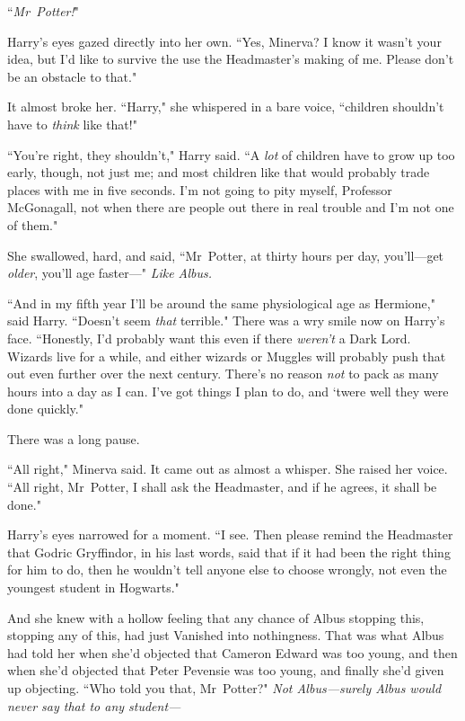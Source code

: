 ``\emph{Mr~Potter!}"

Harry's eyes gazed directly into her own. ``Yes, Minerva? I know it wasn't your idea, but I'd like to survive the use the Headmaster's making of me. Please don't be an obstacle to that."

It almost broke her. ``Harry," she whispered in a bare voice, ``children shouldn't have to \emph{think} like that!"

``You're right, they shouldn't," Harry said. ``A \emph{lot} of children have to grow up too early, though, not just me; and most children like that would probably trade places with me in five seconds. I'm not going to pity myself, Professor McGonagall, not when there are people out there in real trouble and I'm not one of them."

She swallowed, hard, and said, ``Mr~Potter, at thirty hours per day, you'll—get \emph{older}, you'll age faster—" \emph{Like Albus.}

``And in my fifth year I'll be around the same physiological age as Hermione," said Harry. ``Doesn't seem \emph{that} terrible." There was a wry smile now on Harry's face. ``Honestly, I'd probably want this even if there \emph{weren't} a Dark Lord. Wizards live for a while, and either wizards or Muggles will probably push that out even further over the next century. There's no reason \emph{not} to pack as many hours into a day as I can. I've got things I plan to do, and `twere well they were done quickly."

There was a long pause.

``All right," Minerva said. It came out as almost a whisper. She raised her voice. ``All right, Mr~Potter, I shall ask the Headmaster, and if he agrees, it shall be done."

Harry's eyes narrowed for a moment. ``I see. Then please remind the Headmaster that Godric Gryffindor, in his last words, said that if it had been the right thing for him to do, then he wouldn't tell anyone else to choose wrongly, not even the youngest student in Hogwarts."

And she knew with a hollow feeling that any chance of Albus stopping this, stopping any of this, had just Vanished into nothingness. That was what Albus had told her when she'd objected that Cameron Edward was too young, and then when she'd objected that Peter Pevensie was too young, and finally she'd given up objecting. ``Who told you that, Mr~Potter?" \emph{Not Albus—surely Albus would never \emph{say} that to any student—}

